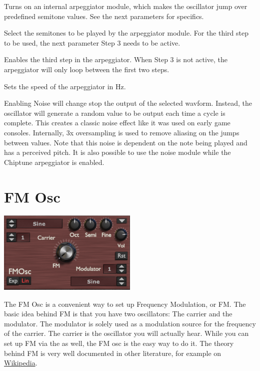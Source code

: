 {Turns on an internal arpeggiator module, which makes the oscillator jump over predefined semitone values. See the next parameters for specifics.}

{Select the semitones to be played by the arpeggiator module. For the third step to be used, the next parameter Step 3 needs to be active.}

{Enables the third step in the arpeggiator. When Step 3 is not active, the arpeggiator will only loop between the first two steps.}

{Sets the speed of the arpeggiator in Hz.}

{Enabling Noise will change stop the output of the selected wavform. Instead, the oscillator will generate a random value to be output each time a cycle is complete. This creates a classic noise effect like it was used on early game consoles. Internally, 3x oversampling is used to remove aliasing on the jumps between values. Note that this noise is dependent on the note being played and has a perceived pitch. It is also possible to use the noise module while the Chiptune arpeggiator is enabled.}

\section{FM Osc}
\begin{center}
    \includegraphics[width=0.5\textwidth]{graphics/fm_osc.png}
\end{center}
The FM Osc is a convenient way to set up Frequency Modulation, or FM. The basic idea behind FM is that you have two oscillators: The carrier and the modulator. The modulator is solely used as a modulation source for the frequency of the carrier. The carrier is the oscillator you will actually hear. While you can set up FM via the \modmatrix as well, the FM osc is the easy way to do it. The theory behind FM is very well documented in other literature, for example on \hyperlink{https://de.wikipedia.org/wiki/FM-Synthese}{Wikipedia}.

